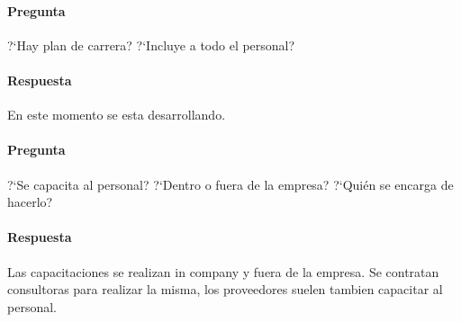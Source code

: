 \documentclass[12pt,a4paper,spanish]{article}
\begin{document}
	\paragraph{Pregunta}
	 ?`Hay plan de carrera?  ?`Incluye a todo el personal?
	\paragraph{Respuesta}
	En este momento se esta desarrollando.
	
	\paragraph{Pregunta}
	 ?`Se capacita al personal?  ?`Dentro o fuera de la empresa?  ?`Qui\'en se encarga de hacerlo?
	\paragraph{Respuesta}
	Las capacitaciones se realizan in company y fuera de la empresa. Se contratan consultoras para realizar la misma, los proveedores suelen tambien capacitar al personal. 
\end{document}
